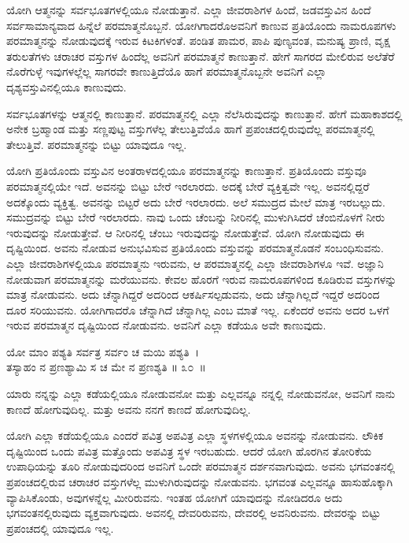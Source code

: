 ಯೋಗಿ ಆತ್ಮನನ್ನು ಸರ್ವಭೂತಗಳಲ್ಲಿಯೂ ನೋಡುತ್ತಾನೆ. ಎಲ್ಲಾ ಜೀವರಾಶಿಗಳ ಹಿಂದೆ, ಜಡವಸ್ತುವಿನ ಹಿಂದೆ ಸರ್ವಸಾಮಾನ್ಯವಾದ ಹಿನ್ನೆಲೆ ಪರಮಾತ್ಮನೊಬ್ಬನೆ. ಯೋಗಿಗಾದರೊ\break ಅವನಿಗೆ ಕಾಣುವ ಪ್ರತಿಯೊಂದು ನಾಮರೂಪಗಳು ಪರಮಾತ್ಮನನ್ನು ನೋಡುವುದಕ್ಕೆ ಇರುವ ಕಿಟಕಿಗಳಂತೆ. ಪಂಡಿತ ಪಾಮರ, ಪಾಪಿ ಪುಣ್ಯವಂತ, ಮನುಷ್ಯ ಪ್ರಾಣಿ, ವೃಕ್ಷ ತರುಲತೆಗಳು ಚರಾಚರ ವಸ್ತುಗಳ ಹಿಂದೆಲ್ಲ ಅವನಿಗೆ ಪರಮಾತ್ಮನೆ ಕಾಣುತ್ತಾನೆ. ಹೇಗೆ ಸಾಗರದ ಮೇಲಿರುವ ಅಲೆತೆರೆ ನೊರೆಗುಳ್ಳೆ ಇವುಗಳಲ್ಲೆಲ್ಲ ಸಾಗರವೇ ಕಾಣುತ್ತಿದೆಯೊ ಹಾಗೆ ಪರಮಾತ್ಮನೊಬ್ಬನೇ ಅವನಿಗೆ ಎಲ್ಲಾ ದೃಶ್ಯವಸ್ತುವಿನಲ್ಲಿಯೂ ಕಾಣುವುದು.

\newpage

ಸರ್ವಭೂತಗಳನ್ನು ಆತ್ಮನಲ್ಲಿ ಕಾಣುತ್ತಾನೆ. ಪರಮಾತ್ಮನಲ್ಲಿ ಎಲ್ಲಾ ನೆಲೆಸಿರುವುದನ್ನು ಕಾಣುತ್ತಾನೆ. ಹೇಗೆ ಮಹಾಕಾಶದಲ್ಲಿ ಅನೇಕ ಬ್ರಹ್ಮಾಂಡ ಮತ್ತು ಸಣ್ಣಪುಟ್ಟ ವಸ್ತುಗಳೆಲ್ಲ ತೇಲುತ್ತಿವೆಯೊ ಹಾಗೆ ಪ್ರಪಂಚದಲ್ಲಿರುವುದೆಲ್ಲ ಪರಮಾತ್ಮನಲ್ಲಿ ತೇಲುತ್ತಿವೆ. ಪರಮಾತ್ಮನನ್ನು ಬಿಟ್ಟು ಯಾವುದೂ ಇಲ್ಲ.

ಯೋಗಿ ಪ್ರತಿಯೊಂದು ವಸ್ತುವಿನ ಅಂತರಾಳದಲ್ಲಿಯೂ ಪರಮಾತ್ಮನನ್ನು ಕಾಣುತ್ತಾನೆ. ಪ್ರತಿಯೊಂದು ವಸ್ತುವೂ ಪರಮಾತ್ಮನಲ್ಲಿಯೇ ಇದೆ. ಅವನನ್ನು ಬಿಟ್ಟು ಬೇರೆ ಇರಲಾರದು. ಅದಕ್ಕೆ ಬೇರೆ ವ್ಯಕ್ತಿತ್ವವೇ ಇಲ್ಲ. ಅವನಲ್ಲಿದ್ದರೆ ಅದಕ್ಕೊಂದು ವ್ಯಕ್ತಿತ್ವ. ಅವನನ್ನು ಬಿಟ್ಟರೆ ಅದು ಬೇರೆ ಇರಲಾರದು. ಅಲೆ ಸಮುದ್ರದ ಮೇಲೆ ಮಾತ್ರ ಇರಬಲ್ಲುದು. ಸಮುದ್ರವನ್ನು ಬಿಟ್ಟು ಬೇರೆ ಇರಲಾರದು. ನಾವು ಒಂದು ಚೆಂಬನ್ನು ನೀರಿನಲ್ಲಿ ಮುಳುಗಿಸಿದರೆ ಚೆಂಬಿನೊಳಗೆ ನೀರು ಇರುವುದನ್ನು ನೋಡುತ್ತೇವೆ. ಆ ನೀರಿನಲ್ಲಿ ಚೆಂಬು ಇರುವುದನ್ನು ನೋಡುತ್ತೇವೆ. ಯೋಗಿ ನೋಡುವುದು ಈ ದೃಷ್ಟಿಯಿಂದ. ಅವನು ನೋಡುವ ಅನುಭವಿಸುವ ಪ್ರತಿಯೊಂದು ವಸ್ತುವನ್ನು ಪರಮಾತ್ಮನೊಡನೆ ಸಂಬಂಧಿಸುವನು. ಎಲ್ಲಾ ಜೀವರಾಶಿಗಳಲ್ಲಿಯೂ ಪರಮಾತ್ಮನು ಇರುವನು, ಆ ಪರಮಾತ್ಮನಲ್ಲಿ ಎಲ್ಲಾ ಜೀವರಾಶಿಗಳೂ ಇವೆ. ಅಜ್ಞಾನಿ ನೋಡುವಾಗ ಪರಮಾತ್ಮನನ್ನು ಮರೆಯುವನು. ಕೇವಲ ಹೊರಗೆ ಇರುವ ನಾಮರೂಪಗಳಿಂದ ಕೂಡಿರುವ ವಸ್ತುಗಳನ್ನು ಮಾತ್ರ ನೋಡುವನು. ಅದು ಚೆನ್ನಾಗಿದ್ದರೆ ಅದರಿಂದ ಆಕರ್ಷಿಸಲ್ಪಡುವನು, ಅದು ಚೆನ್ನಾಗಿಲ್ಲದೆ ಇದ್ದರೆ ಅದರಿಂದ ದೂರ ಸರಿಯುವನು. ಯೋಗಿಗಾದರೊ ಚೆನ್ನಾಗಿದೆ ಚೆನ್ನಾಗಿಲ್ಲ ಎಂಬ ಮಾತೆ ಇಲ್ಲ. ಏಕೆಂದರೆ ಅವನು ಅದರ ಒಳಗೆ ಇರುವ ಪರಮಾತ್ಮನ ದೃಷ್ಟಿಯಿಂದ ನೋಡುವನು. ಅವನಿಗೆ ಎಲ್ಲಾ ಕಡೆಯೂ ಅವೇ ಕಾಣುವುದು.

\begin{shloka}
ಯೋ ಮಾಂ ಪಶ್ಯತಿ ಸರ್ವತ್ರ ಸರ್ವಂ ಚ ಮಯಿ ಪಶ್ಯತಿ~।\\ತಸ್ಯಾಹಂ ನ ಪ್ರಣಶ್ಯಾಮಿ ಸ ಚ ಮೇ ನ ಪ್ರಣಶ್ಯತಿ \hfill॥ ೩೦~॥
\end{shloka}

\begin{artha}
ಯಾರು ನನ್ನನ್ನು ಎಲ್ಲಾ ಕಡೆಯಲ್ಲಿಯೂ ನೋಡುವನೋ ಮತ್ತು ಎಲ್ಲವನ್ನೂ ನನ್ನಲ್ಲಿ ನೋಡುವನೋ, ಅವನಿಗೆ ನಾನು ಕಾಣದೆ ಹೋಗುವುದಿಲ್ಲ. ಮತ್ತು ಅವನು ನನಗೆ ಕಾಣದೆ ಹೋಗುವುದಿಲ್ಲ.
\end{artha}

ಯೋಗಿ ಎಲ್ಲಾ ಕಡೆಯಲ್ಲಿಯೂ ಎಂದರೆ ಪವಿತ್ರ ಅಪವಿತ್ರ ಎಲ್ಲಾ ಸ್ಥಳಗಳಲ್ಲಿಯೂ ಅವನನ್ನು ನೋಡುವನು. ಲೌಕಿಕ ದೃಷ್ಟಿಯಿಂದ ಒಂದು ಪವಿತ್ರ ಮತ್ತೊಂದು ಅಪವಿತ್ರ ಸ್ಥಳ ಇರಬಹುದು. ಆದರೆ ಯೋಗಿ ಹೊರಗಿನ ತೋರಿಕೆಯ ಉಪಾಧಿಯನ್ನು ತೂರಿ ನೋಡುವುದರಿಂದ ಅವನಿಗೆ ಒಂದೇ ಪರಮಾತ್ಮನ ದರ್ಶನವಾಗುವುದು. ಅವನು ಭಗವಂತನಲ್ಲಿ ಪ್ರಪಂಚದಲ್ಲಿರುವ ಚರಾಚರ ವಸ್ತುಗಳೆಲ್ಲ ಮುಳುಗಿರುವುದನ್ನು ನೋಡುವನು. ಭಗವಂತ ಎಲ್ಲವನ್ನೂ ಹಾಸುಹೊಕ್ಕಾಗಿ ವ್ಯಾಪಿಸಿಕೊಂಡು, ಅವುಗಳನ್ನೆಲ್ಲ ಮೀರಿರುವನು. ಇಂತಹ ಯೋಗಿಗೆ ಯಾವುದನ್ನು ನೋಡಿದರೂ ಅದು ಭಗವಂತನಲ್ಲಿರುವುದು ವ್ಯಕ್ತವಾಗುವುದು. ಅವನಲ್ಲಿ ದೇವರಿರುವನು, ದೇವರಲ್ಲಿ ಅವನಿರುವನು. ದೇವರನ್ನು ಬಿಟ್ಟು ಪ್ರಪಂಚದಲ್ಲಿ ಯಾವುದೂ ಇಲ್ಲ.

